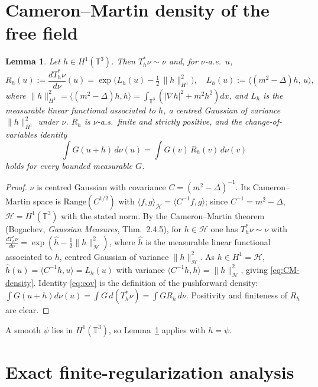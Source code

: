 \documentclass[12pt]{article}
\newcommand{\bT}{\mathbb{T}}
\newcommand{\cH}{\mathcal{H}}
\theoremstyle{plain}
\newtheorem{lemma}{Lemma}
\theoremstyle{definition}
\begin{document}
\section{Cameron--Martin density of the free field}\label{sec:CM}

\begin{lemma}\label{lem:CM}
Let $h\in H^1(\bT^3)$. Then $T_h^*\nu\sim\nu$ and, for $\nu$-a.e.\ $u$,
\begin{equation}\label{eq:CM-density}
R_h(u):=\frac{dT_h^*\nu}{d\nu}(u)=\exp\!\Big(L_h(u)-\tfrac12\,\|h\|_{H^1}^2\Big),
\quad L_h(u):=\langle (m^2-\Delta)h,\,u\rangle,
\end{equation}
where $\|h\|_{H^1}^2=\langle(m^2-\Delta)h,h\rangle=\int_{\bT^3}(|\nabla h|^2+m^2 h^2)dx$,
and $L_h$ is the measurable linear functional associated to $h$, a centred Gaussian
of variance $\|h\|_{H^1}^2$ under $\nu$. $R_h$ is $\nu$-a.s.\ finite and strictly
positive, and the change-of-variables identity
\begin{equation}\label{eq:cov}
\int G(u+h)\,d\nu(u)=\int G(v)\,R_h(v)\,d\nu(v)
\end{equation}
holds for every bounded measurable $G$.
\end{lemma}

\begin{proof}
$\nu$ is centred Gaussian with covariance $C=(m^2-\Delta)^{-1}$. Its Cameron--Martin
space is $\mathrm{Range}(C^{1/2})$ with $\langle f,g\rangle_\cH=\langle C^{-1}f,g\rangle$;
since $C^{-1}=m^2-\Delta$, $\cH=H^1(\bT^3)$ with the stated norm. By the
Cameron--Martin theorem (Bogachev, \emph{Gaussian Measures}, Thm.\ 2.4.5), for
$h\in\cH$ one has $T_h^*\nu\sim\nu$ with $\frac{dT_h^*\nu}{d\nu}=\exp(\widehat h-\tfrac12\|h\|_\cH^2)$,
where $\widehat h$ is the measurable linear functional associated to $h$, centred
Gaussian of variance $\|h\|_\cH^2$. As $h\in H^1=\cH$, $\widehat h(u)=\langle C^{-1}h,u\rangle=L_h(u)$
with variance $\langle C^{-1}h,h\rangle=\|h\|_\cH^2$, giving \eqref{eq:CM-density}.
Identity \eqref{eq:cov} is the definition of the pushforward density:
$\int G(u+h)d\nu(u)=\int G\,d(T_h^*\nu)=\int G R_h\,d\nu$. Positivity and finiteness
of $R_h$ are clear.
\end{proof}

A smooth $\psi$ lies in $H^1(\bT^3)$, so Lemma~\ref{lem:CM} applies with $h=\psi$.

\section{Exact finite-regularization analysis}\label{sec:shift}
\end{document}
